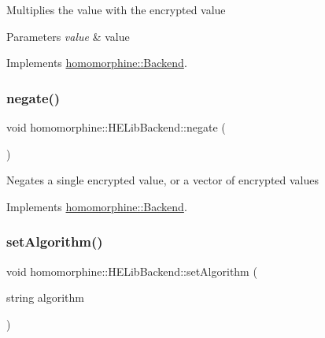 Multiplies the value with the encrypted value


\begin{DoxyParams}{Parameters}
{\em value} & value \\
\hline
\end{DoxyParams}


Implements \mbox{\hyperlink{classhomomorphine_1_1_backend_a8b09933415165eb84234d9ccfbf2c3c4}{homomorphine\+::\+Backend}}.

\mbox{\label{classhomomorphine_1_1_h_e_lib_backend_acb1ed456fa91fc1dfe878abb068f3f34}} 
\subsubsection{\texorpdfstring{negate()}{negate()}}
{\footnotesize\ttfamily void homomorphine\+::\+H\+E\+Lib\+Backend\+::negate (\begin{DoxyParamCaption}{ }\end{DoxyParamCaption})\hspace{0.3cm}{\ttfamily [virtual]}}

Negates a single encrypted value, or a vector of encrypted values 

Implements \mbox{\hyperlink{classhomomorphine_1_1_backend_ab0064461260713ce7a9f660b5f6dc5af}{homomorphine\+::\+Backend}}.

\mbox{\label{classhomomorphine_1_1_h_e_lib_backend_a39478377b0e299fd90f5c7bb6c8efe89}} 
\subsubsection{\texorpdfstring{setAlgorithm()}{setAlgorithm()}}
{\footnotesize\ttfamily void homomorphine\+::\+H\+E\+Lib\+Backend\+::set\+Algorithm (\begin{DoxyParamCaption}\item[{string}]{algorithm }\end{DoxyParamCaption})\hspace{0.3cm}{\ttfamily [virtual]}}

